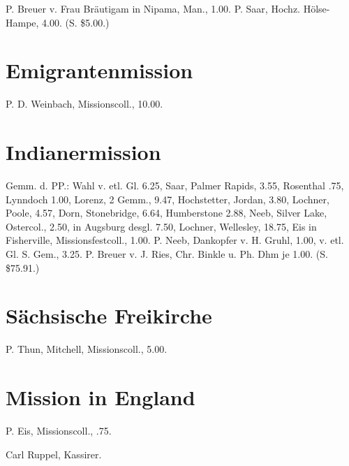 P. Breuer v. Frau Bräutigam in Nipama, Man., 1.00. P. Saar, Hochz. Hölse-Hampe, 4.00. (S. \$5.00.)

\section{Emigrantenmission}

P. D. Weinbach, Missionscoll., 10.00.

\section{Indianermission}

Gemm. d. PP.: Wahl v. etl. Gl. 6.25, Saar, Palmer Rapids, 3.55, Rosenthal .75, Lynndoch 1.00, Lorenz, 2 Gemm., 9.47, Hochstetter, Jordan, 3.80, Lochner, Poole, 4.57, Dorn, Stonebridge, 6.64, Humberstone 2.88, Neeb, Silver Lake, Ostercol., 2.50, in Augsburg desgl. 7.50, Lochner, Wellesley, 18.75, Eis in Fisherville, Missionsfestcoll., 1.00. P. Neeb, Dankopfer v. H. Gruhl, 1.00, v. etl. Gl. S. Gem., 3.25. P. Breuer v. J. Ries, Chr. Binkle u. Ph. Dhm je 1.00. (S. \$75.91.)

\section{Sächsische Freikirche}

P. Thun, Mitchell, Missionscoll., 5.00.

\section{Mission in England}

P. Eis, Missionscoll., .75.

Carl Ruppel, Kassirer.
